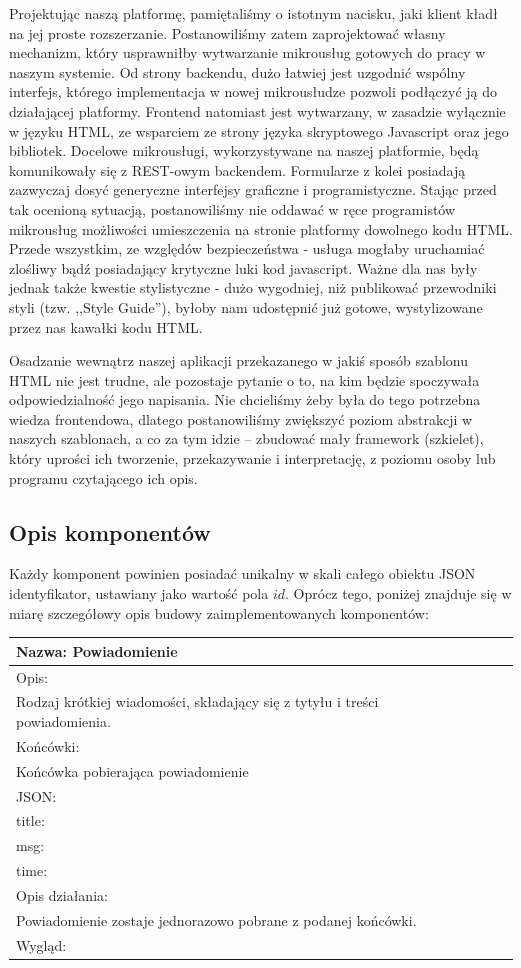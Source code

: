 \documentclass[licencjacka]{pracamgr}
\begin{document}
Projektując naszą platformę, pamiętaliśmy o istotnym nacisku, jaki klient kładł na jej proste rozszerzanie.
Postanowiliśmy zatem zaprojektować własny mechanizm, który usprawniłby wytwarzanie mikrousług gotowych do pracy w naszym systemie.
Od strony backendu, dużo łatwiej jest uzgodnić wspólny interfejs, którego implementacja w nowej mikrousłudze pozwoli podłączyć ją do działającej platformy.
Frontend natomiast jest wytwarzany, w zasadzie wyłącznie w języku HTML, ze wsparciem ze strony języka skryptowego Javascript oraz jego bibliotek.
Docelowe mikrousługi, wykorzystywane na naszej platformie, będą komunikowały się z REST-owym backendem.
Formularze z kolei posiadają zazwyczaj dosyć generyczne interfejsy graficzne i programistyczne.
Stając przed tak ocenioną sytuacją, postanowiliśmy nie oddawać w ręce programistów mikrousług możliwości umieszczenia na stronie platformy dowolnego kodu HTML.
Przede wszystkim, ze względów bezpieczeństwa - usługa mogłaby uruchamiać zlośliwy bądź posiadający krytyczne luki kod javascript.
Ważne dla nas były jednak także kwestie stylistyczne - dużo wygodniej, niż publikować przewodniki styli (tzw. ,,Style Guide''),
byłoby nam udostępnić już gotowe, wystylizowane przez nas kawałki kodu HTML.

Osadzanie wewnątrz naszej aplikacji przekazanego w jakiś sposób szablonu HTML nie jest trudne, ale pozostaje pytanie o to,
na kim będzie spoczywała odpowiedzialność jego napisania. Nie chcieliśmy
żeby była do tego potrzebna wiedza frontendowa,
dlatego postanowiliśmy zwiększyć poziom abstrakcji w naszych szablonach,
a co za tym idzie -- zbudować mały framework (szkielet),
który uprości ich tworzenie, przekazywanie i interpretację, z poziomu osoby lub programu czytającego ich opis.

\subsection{Opis komponentów}

Każdy komponent powinien posiadać unikalny w skali całego obiektu JSON identyfikator, ustawiany jako wartość pola $id$. Oprócz tego, poniżej znajduje się w miarę szczegółowy opis budowy zaimplementowanych komponentów: \\

\begin{tabularx}{\linewidth}{|l|l|c|X|l|}\hline
\textbf{Nazwa:}
Powiadomienie
\\\hline
Opis:\\

Rodzaj krótkiej wiadomości, składający się z tytyłu i treści powiadomienia.\\\hline
Końcówki:\\
Końcówka pobierająca powiadomienie\\\hline
JSON: \\
title: \\
msg:\\
time:\\\hline
Opis działania:\\
Powiadomienie zostaje jednorazowo pobrane z podanej końcówki.\\\hline
Wygląd:\\\hline
\end{tabularx}
\end{document}
